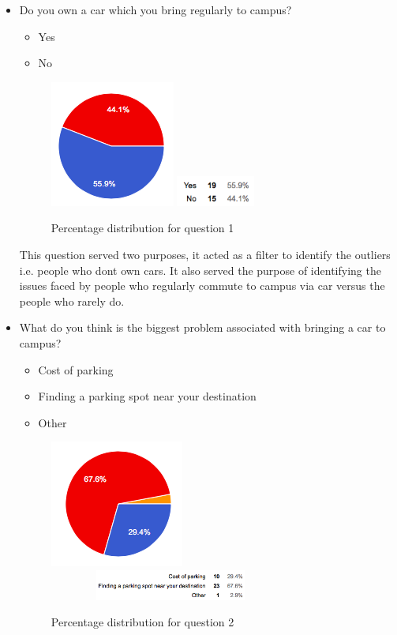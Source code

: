 \documentclass{acm_proc_article-sp}
\begin{document}
\begin{itemize}
    \item Do you own a car which you bring regularly to campus?
    \begin{itemize}
        \item Yes
        \item No
    \end{itemize}
    
    \begin{figure}[h!]
        \includegraphics{Q1}
        \includegraphics[height = 1cm]{Q1_1}
        \caption{Percentage distribution for question 1}
        \label{fig:Q1_1}
    \end{figure}
    
    This question served two purposes, it acted as a filter to identify the outliers i.e. people who don\textsc{}t own cars. It also served the purpose of identifying the issues faced by people who regularly commute to campus via car versus the people who rarely do.
    
    \item What do you think is the biggest problem associated with bringing a car to campus?
    \begin{itemize}
        \item Cost of parking
        \item Finding a parking spot near your destination
        \item Other
    \end{itemize}
    
    \begin{figure}[h!]
        \includegraphics{Q2}
        \includegraphics[width=8cm, height = 1cm]{Q2_2}
        \caption{Percentage distribution for question 2}
        \label{fig:Q2_2}
    \end{figure}
    

\end{itemize}
\end{document}
